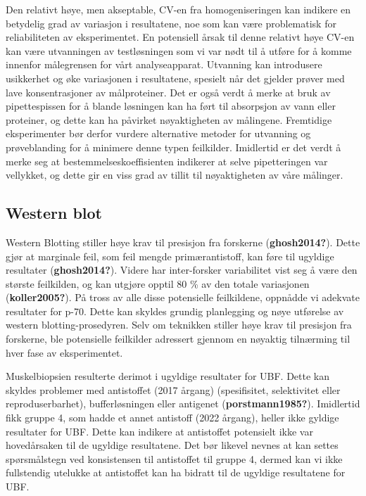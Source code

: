 \documentclass[
  letterpaper,
  DIV=11,
  numbers=noendperiod]{scrreprt}
\begin{document}
Den relativt høye, men akseptable, CV-en fra homogeniseringen kan
indikere en betydelig grad av variasjon i resultatene, noe som kan være
problematisk for reliabiliteten av eksperimentet. En potensiell årsak
til denne relativt høye CV-en kan være utvanningen av testløsningen som
vi var nødt til å utføre for å komme innenfor målegrensen for vårt
analyseapparat. Utvanning kan introdusere usikkerhet og øke variasjonen
i resultatene, spesielt når det gjelder prøver med lave konsentrasjoner
av målproteiner. Det er også verdt å merke at bruk av pipettespissen for
å blande løsningen kan ha ført til absorpsjon av vann eller proteiner,
og dette kan ha påvirket nøyaktigheten av målingene. Fremtidige
eksperimenter bør derfor vurdere alternative metoder for utvanning og
prøveblanding for å minimere denne typen feilkilder. Imidlertid er det
verdt å merke seg at bestemmelseskoeffisienten indikerer at selve
pipetteringen var vellykket, og dette gir en viss grad av tillit til
nøyaktigheten av våre målinger.

\hypertarget{western-blot-1}{%
\subsection{\texorpdfstring{\textbf{Western
blot}}{Western blot}}\label{western-blot-1}}

Western Blotting stiller høye krav til presisjon fra forskerne
(\textbf{ghosh2014?}). Dette gjør at marginale feil, som feil mengde
primærantistoff, kan føre til ugyldige resultater (\textbf{ghosh2014?}).
Videre har inter-forsker variabilitet vist seg å være den største
feilkilden, og kan utgjøre opptil 80 \% av den totale variasjonen
(\textbf{koller2005?}). På tross av alle disse potensielle feilkildene,
oppnådde vi adekvate resultater for p-70. Dette kan skyldes grundig
planlegging og nøye utførelse av western blotting-prosedyren. Selv om
teknikken stiller høye krav til presisjon fra forskerne, ble potensielle
feilkilder adressert gjennom en nøyaktig tilnærming til hver fase av
eksperimentet.

Muskelbiopsien resulterte derimot i ugyldige resultater for UBF. Dette
kan skyldes problemer med antistoffet (2017 årgang) (spesifisitet,
selektivitet eller reproduserbarhet), bufferløsningen eller antigenet
(\textbf{porstmann1985?}). Imidlertid fikk gruppe 4, som hadde et annet
antistoff (2022 årgang), heller ikke gyldige resultater for UBF. Dette
kan indikere at antistoffet potensielt ikke var hovedårsaken til de
ugyldige resultatene. Det bør likevel nevnes at kan settes spørsmålstegn
ved konsistensen til antistoffet til gruppe 4, dermed kan vi ikke
fullstendig utelukke at antistoffet kan ha bidratt til de ugyldige
resultatene for UBF.
\end{document}
